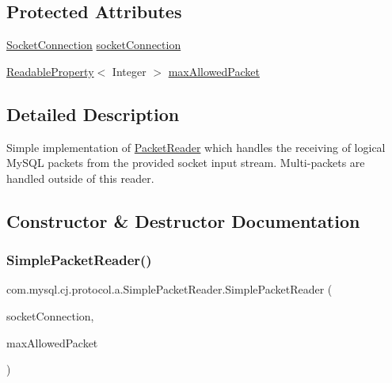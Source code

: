\subsection*{Protected Attributes}
\begin{DoxyCompactItemize}
\item 
\mbox{\hyperlink{interfacecom_1_1mysql_1_1cj_1_1protocol_1_1_socket_connection}{Socket\+Connection}} \mbox{\hyperlink{classcom_1_1mysql_1_1cj_1_1protocol_1_1a_1_1_simple_packet_reader_a6da8bf24cf02fc7519f2080940126bb8}{socket\+Connection}}
\item 
\mbox{\hyperlink{interfacecom_1_1mysql_1_1cj_1_1conf_1_1_readable_property}{Readable\+Property}}$<$ Integer $>$ \mbox{\hyperlink{classcom_1_1mysql_1_1cj_1_1protocol_1_1a_1_1_simple_packet_reader_a05df0f4f040b4a5195123a749d231878}{max\+Allowed\+Packet}}
\end{DoxyCompactItemize}


\subsection{Detailed Description}
Simple implementation of \mbox{\hyperlink{}{Packet\+Reader}} which handles the receiving of logical My\+S\+QL packets from the provided socket input stream. Multi-\/packets are handled outside of this reader. 

\subsection{Constructor \& Destructor Documentation}
\mbox{\label{classcom_1_1mysql_1_1cj_1_1protocol_1_1a_1_1_simple_packet_reader_a25bebda488bbc840c2ed840a576a76a0}} 
\subsubsection{\texorpdfstring{Simple\+Packet\+Reader()}{SimplePacketReader()}}
{\footnotesize\ttfamily com.\+mysql.\+cj.\+protocol.\+a.\+Simple\+Packet\+Reader.\+Simple\+Packet\+Reader (\begin{DoxyParamCaption}\item[{\mbox{\hyperlink{interfacecom_1_1mysql_1_1cj_1_1protocol_1_1_socket_connection}{Socket\+Connection}}}]{socket\+Connection,  }\item[{\mbox{\hyperlink{interfacecom_1_1mysql_1_1cj_1_1conf_1_1_readable_property}{Readable\+Property}}$<$ Integer $>$}]{max\+Allowed\+Packet }\end{DoxyParamCaption})}



